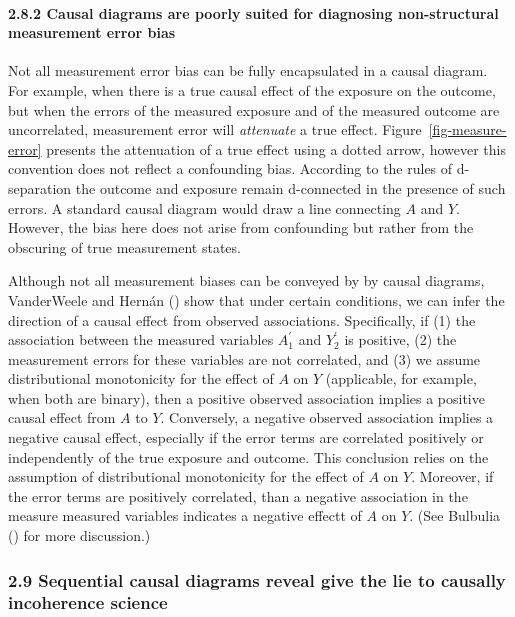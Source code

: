 \documentclass[
  singlecolumn]{article}
\let\oldparagraph\paragraph
\renewcommand{\paragraph}[1]{\oldparagraph{#1}\mbox{}}
\begin{document}
\paragraph{2.8.2 Causal diagrams are poorly suited for diagnosing
non-structural measurement error
bias}\label{causal-diagrams-are-poorly-suited-for-diagnosing-non-structural-measurement-error-bias}

Not all measurement error bias can be fully encapsulated in a causal
diagram. For example, when there is a true causal effect of the exposure
on the outcome, but when the errors of the measured exposure and of the
measured outcome are uncorrelated, measurement error will
\emph{attenuate} a true effect. Figure~\ref{fig-measure-error} presents
the attenuation of a true effect using a dotted arrow, however this
convention does not reflect a confounding bias. According to the rules
of d-separation the outcome and exposure remain d-connected in the
presence of such errors. A standard causal diagram would draw a line
connecting \(A\) and \(Y\). However, the bias here does not arise from
confounding but rather from the obscuring of true measurement states.

Although not all measurement biases can be conveyed by by causal
diagrams, VanderWeele and Hernán
() show that under certain
conditions, we can infer the direction of a causal effect from observed
associations. Specifically, if (1) the association between the measured
variables \(A^{\prime}_{1}\) and \(Y^{\prime}_{2}\) is positive, (2) the
measurement errors for these variables are not correlated, and (3) we
assume distributional monotonicity for the effect of \(A\) on \(Y\)
(applicable, for example, when both are binary), then a positive
observed association implies a positive causal effect from \(A\) to
\(Y\). Conversely, a negative observed association implies a negative
causal effect, especially if the error terms are correlated positively
or independently of the true exposure and outcome. This conclusion
relies on the assumption of distributional monotonicity for the effect
of \(A\) on \(Y\). Moreover, if the error terms are positively
correlated, than a negative association in the measure measured
variables indicates a negative effectt of \(A\) on \(Y\). (See Bulbulia
() for more discussion.)

\subsubsection{2.9 Sequential causal diagrams reveal give the lie to
causally incoherence
science}\label{sequential-causal-diagrams-reveal-give-the-lie-to-causally-incoherence-science}
\end{document}
